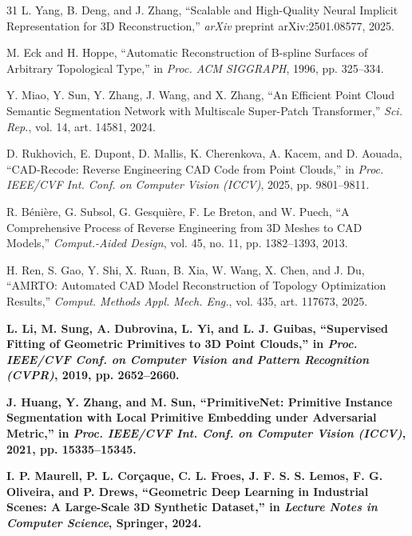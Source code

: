 \documentclass{ieeeaccess}
\providecommand{\DIFaddtex}[1]{{\color{blue}\bfseries #1}} %
\providecommand{\DIFaddbegin}{} %
\providecommand{\DIFaddend}{} %
\providecommand{\DIFadd}[1]{\texorpdfstring{\DIFaddtex{#1}}{#1}} %
\begin{document}
\begin{thebibliography}{31}
L. Yang, B. Deng, and J. Zhang,
``Scalable and High-Quality Neural Implicit Representation for 3D Reconstruction,''
\emph{arXiv} preprint arXiv:2501.08577, 2025.

M. Eck and H. Hoppe,
``Automatic Reconstruction of B-spline Surfaces of Arbitrary Topological Type,''
in \emph{Proc. ACM SIGGRAPH}, 1996, pp. 325--334.

Y. Miao, Y. Sun, Y. Zhang, J. Wang, and X. Zhang,
``An Efficient Point Cloud Semantic Segmentation Network with Multiscale Super-Patch Transformer,''
\emph{Sci. Rep.}, vol. 14, art. 14581, 2024.

D. Rukhovich, E. Dupont, D. Mallis, K. Cherenkova, A. Kacem, and D. Aouada,
``CAD-Recode: Reverse Engineering CAD Code from Point Clouds,''
in \emph{Proc. IEEE/CVF Int. Conf. on Computer Vision (ICCV)}, 2025, pp. 9801--9811.

R. B\'eni\`ere, G. Subsol, G. Gesqui\`ere, F. Le Breton, and W. Puech,
``A Comprehensive Process of Reverse Engineering from 3D Meshes to CAD Models,''
\emph{Comput.-Aided Design}, vol. 45, no. 11, pp. 1382--1393, 2013.

H. Ren, S. Gao, Y. Shi, X. Ruan, B. Xia, W. Wang, X. Chen, and J. Du,
``AMRTO: Automated CAD Model Reconstruction of Topology Optimization Results,''
\emph{Comput. Methods Appl. Mech. Eng.}, vol. 435, art. 117673, 2025.
\DIFaddbegin 

\DIFadd{L. Li, M. Sung, A. Dubrovina, L. Yi, and L. J. Guibas,
``Supervised Fitting of Geometric Primitives to 3D Point Clouds,''
in \emph{Proc. IEEE/CVF Conf. on Computer Vision and Pattern Recognition (CVPR)}, 2019, pp. 2652--2660.
}

\DIFadd{J. Huang, Y. Zhang, and M. Sun,
``PrimitiveNet: Primitive Instance Segmentation with Local Primitive Embedding under Adversarial Metric,''
in \emph{Proc. IEEE/CVF Int. Conf. on Computer Vision (ICCV)}, 2021, pp. 15335--15345.
}

\DIFadd{I. P. Maurell, P. L. Cor\c{c}aque, C. L. Froes, J. F. S. S. Lemos, F. G. Oliveira, and P. Drews,
``Geometric Deep Learning in Industrial Scenes: A Large-Scale 3D Synthetic Dataset,''
in \emph{Lecture Notes in Computer Science}, Springer, 2024.
}\DIFaddend 

\end{thebibliography}
\end{document}
